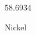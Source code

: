 \documentclass[12pt]{article}
\begin{document}
\hfill{}
\vfill
\begin{center}
  {\fontsize{50}{60}
  }

  \vspace{1em}

  58.6934

Nickel
\end{center}
\vfill
\end{document}

